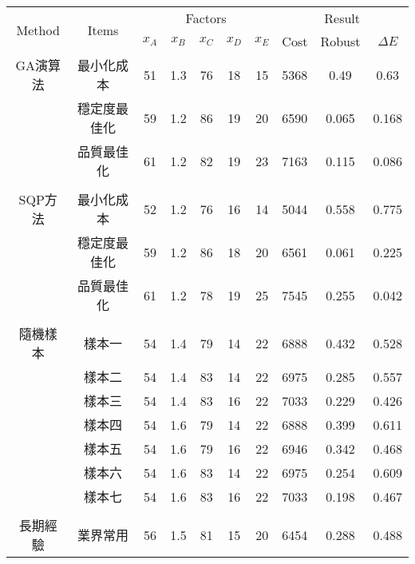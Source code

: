 \begin{tabular}{cccccccccc}
\hline
\multirow{2}{*}{Method} &
\multirow{2}{*}{Items} &
\multicolumn{5}{c}{Factors} &
\multicolumn{3}{c}{\multirow{1}{*}{Result}} \\
\cline{3-10}
  & &$x_A$ & $x_B$ & $x_C$ & $x_D$ & $x_E$ & Cost & Robust & $\Delta E$ \\
\hline\hline
GA演算法 & 最小化成本 & 51 & 1.3 & 76 & 18 & 15 & 5368 & 0.49 & 0.63 \\ 
& 穩定度最佳化 & 59 & 1.2 & 86 & 19 & 20 & 6590 & 0.065 & 0.168 \\ 
& 品質最佳化 & 61 & 1.2 & 82 & 19 & 23 & 7163 & 0.115 & 0.086 \\
\\
SQP方法 & 最小化成本 & 52 & 1.2 & 76 & 16 & 14 & 5044 & 0.558 & 0.775 \\ 
& 穩定度最佳化 & 59 & 1.2 & 86 & 18 & 20 & 6561 & 0.061 & 0.225 \\ 
& 品質最佳化 & 61 & 1.2 & 78 & 19 & 25 & 7545 & 0.255 & 0.042 \\ 
\\
隨機樣本 & 樣本一 & 54 & 1.4 & 79 & 14 & 22 & 6888 & 0.432 & 0.528 \\ 
& 樣本二 & 54 & 1.4 & 83 & 14 & 22 & 6975 & 0.285 & 0.557 \\ 
& 樣本三 & 54 & 1.4 & 83 & 16 & 22 & 7033 & 0.229 & 0.426 \\
& 樣本四 & 54 & 1.6 & 79 & 14 & 22 & 6888 & 0.399 & 0.611 \\ 
& 樣本五 & 54 & 1.6 & 79 & 16 & 22 & 6946 & 0.342 & 0.468 \\ 
& 樣本六 & 54 & 1.6 & 83 & 14 & 22 & 6975 & 0.254 & 0.609 \\ 
& 樣本七 & 54 & 1.6 & 83 & 16 & 22 & 7033 & 0.198 & 0.467 \\ 
\\
長期經驗 & 業界常用 & 56 & 1.5 & 81 & 15 & 20 & 6454 & 0.288 & 0.488 \\
\hline
\end{tabular}